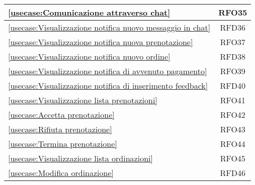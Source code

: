 \begin{longtable}{|l|c|}
	\hline
	\autoref{usecase:Comunicazione attraverso chat}                                                                                                              & RFO35                  \\
	\hline
	\autoref{usecase:Visualizzazione notifica nuovo messaggio in chat}                                                                                           & RFD36                  \\
	\hline
	\autoref{usecase:Visualizzazione notifica nuova prenotazione}                                                                                                & RFO37                  \\
	\hline
	\autoref{usecase:Visualizzazione notifica nuovo ordine}                                                                                                      & RFD38                  \\
	\hline
	\autoref{usecase:Visualizzazione notifica di avvenuto pagamento}                                                                                             & RFO39                  \\
	\hline
	\autoref{usecase:Visualizzazione notifica di inserimento feedback}                                                                                           & RFD40                  \\
	\hline
	\autoref{usecase:Visualizzazione lista prenotazioni}                                                                                                         & RFO41                  \\
	\hline
	\autoref{usecase:Accetta prenotazione}                                                                                                                       & RFO42                  \\
	\hline
	\autoref{usecase:Rifiuta prenotazione}                                                                                                                       & RFO43                  \\
	\hline
	\autoref{usecase:Termina prenotazione}                                                                                                                       & RFO44                  \\
	\hline
	\autoref{usecase:Visualizzazione lista ordinazioni}                                                                                                          & RFO45                  \\
	\hline
	\autoref{usecase:Modifica ordinazione}                                                                                                                       & RFD46                  \\

\end{longtable}
